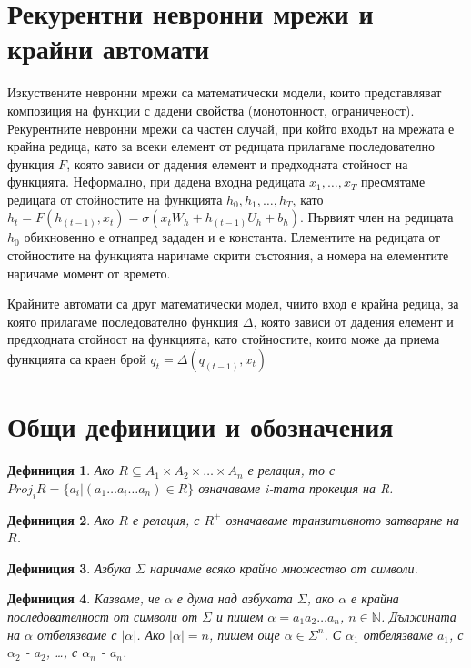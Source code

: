 \documentclass[a4paper,12pt]{article}
\newtheorem{defn}{Дефиниция}[section]
\begin{document}
\pagebreak

\section{Рекурентни невронни мрежи и крайни автомати}

Изкуствените невронни мрежи са математически модели, които представляват композиция на функции с дадени свойства (монотонност, ограниченост). Рекурентните невронни мрежи са частен случай, при който входът на мрежата е крайна редица, като за всеки елемент от редицата прилагаме последователно функция $F$, която зависи от дадения елемент и предходната стойност на функцията. Неформално, при дадена входна редицата $x_1, \ldots, x_T$ пресмятаме редицата от стойностите на функцията $h_0, h_1, \ldots, h_T$, като $h_t = F(h_{(t-1)}, x_t) = \sigma(x_tW_h + h_{(t-1)}U_h + b_h)$. Първият член на редицата $h_0$ обикновенно е отнапред зададен и е константа. Елементите на редицата от стойностите на функцията наричаме скрити състояния, а номера на елементите наричаме момент от времето.

Крайните автомати са друг математически модел, чиито вход е крайна редица, за която прилагаме последователно функция $\Delta$, която зависи от дадения елемент и предходната стойност на функцията, като стойностите, които може да приема функцията са краен брой
$q_t = \Delta(q_{(t-1)}, x_t)$

\section{Общи дефиниции и обозначения}

\begin{defn}
Ако $R \subseteq A_1 \times A_2 \times \ldots \times A_n$ е релация, то с $Proj_iR = \{a_i | (a_1 \ldots a_i \ldots a_n) \in R\}$ означаваме i-тата прокеция на R.
\end{defn}

\begin{defn}
Ако $R$ е релация, с $R^+$ означаваме транзитивното затваряне на $R$.
\end{defn}

\begin{defn}
Азбука $\Sigma$ наричаме всяко крайно множество от символи.
\end{defn}

\begin{defn}
Казваме, че $\alpha$ е дума над азбуката $\Sigma$, ако $\alpha$ е крайна последователност от символи от $\Sigma$ и пишем $\alpha = a_1 a_2 \ldots a_n$, $n \in \mathbb N$.
Дължината на $\alpha$ отбелязваме с $|\alpha|$. Ако $|\alpha| = n$, пишем още $\alpha \in \Sigma^n$.
С $\alpha_1$ отбелязваме $a_1$, с $\alpha_2$ - $a_2$, \ldots, с $\alpha_n$ - $a_n$.
\end{defn}
\end{document}
